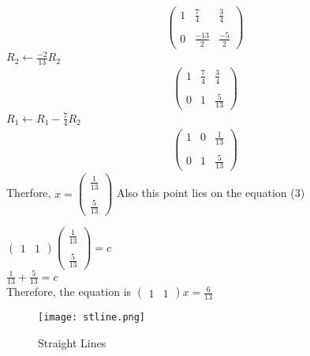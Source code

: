 \documentclass[12pt]{article}
\newcommand{\myvec}[1]{\ensuremath{\begin{pmatrix}#1\end{pmatrix}}}
\begin{document}
\begin{enumerate}
\begin{align}
\begin{pmatrix}
    1 & \frac{7}{4} & \frac{3}{4} \\ \\
    0 & \frac{-13}{2} & \frac{-5}{2}
  \end{pmatrix}
\end{align}
$R_2 \leftarrow \frac{-2}{13}R_2$
\begin{align}
\begin{pmatrix}
    1 & \frac{7}{4} & \frac{3}{4} \\ \\
    0 & 1 & \frac{5}{13}
  \end{pmatrix}
\end{align}
$R_1 \leftarrow R_1-\frac{7}{4}R_2$
\begin{align}
\begin{pmatrix}
    1 & 0 & \frac{1}{13} \\ \\
    0 & 1 & \frac{5}{13}
  \end{pmatrix}
\end{align}
Therfore, $x = \myvec{\frac{1}{13}\\ \\ \frac{5}{13}}$ Also this point lies on the equation (3)\\
\begin{center}
    $\myvec{1 & 1}\myvec{\frac{1}{13} \\ \\ \frac{5}{13}} = c$
    \vspace{\baselineskip}\\
    $\frac{1}{13}+\frac{5}{13} = c$
     \vspace{\baselineskip}\\
    Therefore, the equation is $\myvec{1&1}x=\frac{6}{13}$
\end{center}
\begin{figure}
    \centering
	\texttt{[image: stline.png]}
    \caption{Straight Lines}
    \label{fig:enter-label}
\end{figure}
\end{enumerate}
\end{document}
